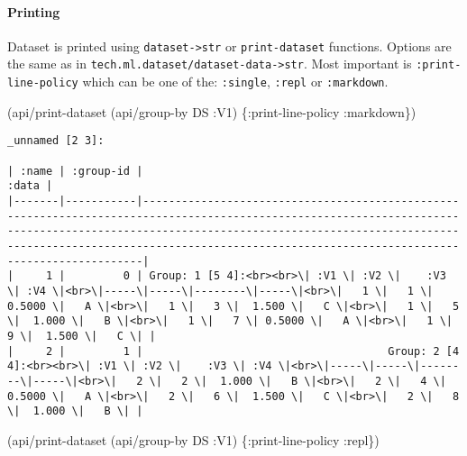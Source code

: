 \documentclass[]{article}
\newenvironment{Shaded}{\begin{snugshade}}{\end{snugshade}}
\newcommand{\AttributeTok}[1]{\textcolor[rgb]{0.77,0.63,0.00}{#1}}
\newcommand{\NormalTok}[1]{#1}
\let\oldparagraph\paragraph
\renewcommand{\paragraph}[1]{\oldparagraph{#1}\mbox{}}
\begin{document}
\paragraph{Printing}\label{printing}

Dataset is printed using \texttt{dataset-\textgreater{}str} or
\texttt{print-dataset} functions. Options are the same as in
\texttt{tech.ml.dataset/dataset-data-\textgreater{}str}. Most important
is \texttt{:print-line-policy} which can be one of the:
\texttt{:single}, \texttt{:repl} or \texttt{:markdown}.

\begin{Shaded}
\begin{Highlighting}[]
\NormalTok{(api/print-dataset (api/group-by DS }\AttributeTok{:V1}\NormalTok{) \{}\AttributeTok{:print-line-policy} \AttributeTok{:markdown}\NormalTok{\})}
\end{Highlighting}
\end{Shaded}

\begin{verbatim}
_unnamed [2 3]:

| :name | :group-id |                                                                                                                                                                                                                                                                                  :data |
|-------|-----------|----------------------------------------------------------------------------------------------------------------------------------------------------------------------------------------------------------------------------------------------------------------------------------------|
|     1 |         0 | Group: 1 [5 4]:<br><br>\| :V1 \| :V2 \|    :V3 \| :V4 \|<br>\|-----\|-----\|--------\|-----\|<br>\|   1 \|   1 \| 0.5000 \|   A \|<br>\|   1 \|   3 \|  1.500 \|   C \|<br>\|   1 \|   5 \|  1.000 \|   B \|<br>\|   1 \|   7 \| 0.5000 \|   A \|<br>\|   1 \|   9 \|  1.500 \|   C \| |
|     2 |         1 |                                      Group: 2 [4 4]:<br><br>\| :V1 \| :V2 \|    :V3 \| :V4 \|<br>\|-----\|-----\|--------\|-----\|<br>\|   2 \|   2 \|  1.000 \|   B \|<br>\|   2 \|   4 \| 0.5000 \|   A \|<br>\|   2 \|   6 \|  1.500 \|   C \|<br>\|   2 \|   8 \|  1.000 \|   B \| |
\end{verbatim}

\begin{Shaded}
\begin{Highlighting}[]
\NormalTok{(api/print-dataset (api/group-by DS }\AttributeTok{:V1}\NormalTok{) \{}\AttributeTok{:print-line-policy} \AttributeTok{:repl}\NormalTok{\})}
\end{Highlighting}
\end{Shaded}
\end{document}
